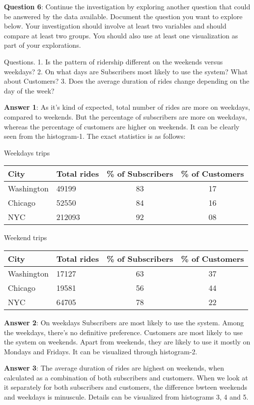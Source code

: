 \documentclass[11pt]{article}
\begin{document}
\textbf{Question 6}: Continue the investigation by exploring another
question that could be answered by the data available. Document the
question you want to explore below. Your investigation should involve at
least two variables and should compare at least two groups. You should
also use at least one visualization as part of your explorations.

Questions. 1. Is the pattern of ridership different on the weekends
versus weekdays? 2. On what days are Subscribers most likely to use the
system? What about Customers? 3. Does the average duration of rides
change depending on the day of the week?

\textbf{Answer 1}: As it's kind of expected, total number of rides are
more on weekdays, compared to weekends. But the percentage of
subscribers are more on weekdays, whereas the percentage of customers
are higher on weekends. It can be clearly seen from the histogram-1. The
exact statistics is as follows:

Weekdays trips

\begin{longtable}[]{@{}llcc@{}}
\toprule
City & Total rides & \% of Subscribers & \% of Customers\tabularnewline
\midrule
\endhead
Washington & 49199 & 83 & 17\tabularnewline
Chicago & 52550 & 84 & 16\tabularnewline
NYC & 212093 & 92 & 08\tabularnewline
\bottomrule
\end{longtable}

Weekend trips

\begin{longtable}[]{@{}llcc@{}}
\toprule
City & Total rides & \% of Subscribers & \% of Customers\tabularnewline
\midrule
\endhead
Washington & 17127 & 63 & 37\tabularnewline
Chicago & 19581 & 56 & 44\tabularnewline
NYC & 64705 & 78 & 22\tabularnewline
\bottomrule
\end{longtable}

\textbf{Answer 2}: On weekdays Subscribers are most likely to use the
system. Among the weekdays, there's no definitive preference. Customers
are most likely to use the system on weekends. Apart from weekends, they
are likely to use it mostly on Mondays and Fridays. It can be visualized
through histogram-2.

\textbf{Answer 3}: The average duration of rides are highest on
weekends, when calculated as a combination of both subscribers and
customers. When we look at it separately for both subscribers and
customers, the difference bwteen weekends and weekdays is minuscule.
Details can be visualized from histograms 3, 4 and 5.
\end{document}
